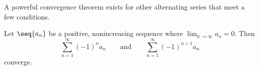 \documentclass{ximera}
\begin{document}
A powerful convergence theorem exists for other alternating series
that meet a few conditions.

\begin{theorem}
Let $\seq{a_n}$ be a positive, nonincreasing sequence where
$\lim_{n\to\infty}a_n=0$. Then
\[
\sum_{n=1}^\infty (-1)^{n}a_n \qquad \text{and}\qquad \sum_{n=1}^\infty (-1)^{n+1}a_n 
\]
converge.
\end{theorem}

\end{document}
